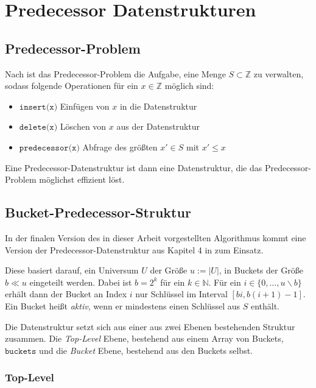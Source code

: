 \section{Predecessor Datenstrukturen}

\subsection{Predecessor-Problem}

Nach \cite{dinklage_engineering_2021} ist das Predecessor-Problem die Aufgabe, eine Menge $S \subset \mathbb{Z}$ zu verwalten, sodass folgende Operationen für ein $x \in \mathbb{Z}$ möglich sind:

\begin{itemize}
	\item $\texttt{insert(x)}$ Einfügen von $x$ in die Datenstruktur
	\item $\texttt{delete(x)}$ Löschen von $x$ aus der Datenstruktur
	\item $\texttt{predecessor(x)}$ Abfrage des größten $x' \in S$ mit $x' \leq x$
\end{itemize}

Eine Predecessor-Datenstruktur ist dann eine Datenstruktur, die das Predecessor-Problem möglichst effizient löst.

\subsection{Bucket-Predecessor-Struktur}

In der finalen Version des in dieser Arbeit vorgestellten Algorithmus kommt eine Version der Predecessor-Datenstruktur aus Kapitel 4 in \cite{dinklage_engineering_2021} zum Einsatz.

Diese basiert darauf, ein Universum $U$ der Größe $u := |U|$, in Buckets der Größe $b \ll u$ eingeteilt werden. Dabei ist $b = 2^k$ für ein $k \in \mathbb{N}$. Für ein $i \in \{0, \dots, u \backslash b \}$ erhält dann der Bucket an Index $i$ nur Schlüssel im Interval $[bi, b(i + 1) - 1]$. Ein Bucket heißt \textit{aktiv}, wenn er mindestens einen Schlüssel aus $S$ enthält.

Die Datenstruktur setzt sich aus einer aus zwei Ebenen bestehenden Struktur zusammen. Die \textit{Top-Level} Ebene, bestehend aus einem Array von Buckets, $\texttt{buckets}$ und die \textit{Bucket} Ebene, bestehend aus den Buckets selbst.

\subsubsection{Top-Level}

